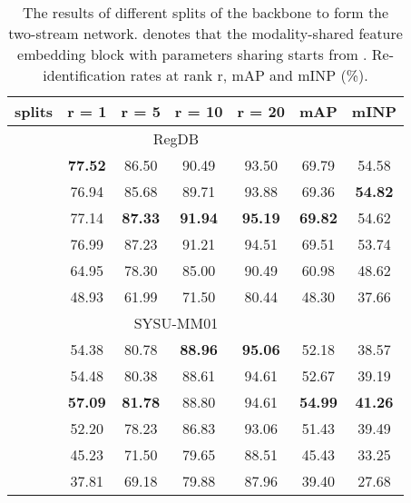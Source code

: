 \documentclass[journal]{IEEEtran}
\begin{document}
\begin{table}
\caption{The results of different splits of the backbone to form the two-stream network.  denotes that the modality-shared feature embedding block with parameters sharing starts from  . Re-identification rates at rank r, mAP and mINP (\%).}
\label{tab:net_share}
  \centering
\begin{tabular}{l|c|c|c|c|c|c}
    \toprule[2pt]
    splits  & r = 1 & r = 5 & r = 10 & r = 20 & mAP & mINP \\ \toprule[2pt]
    \multicolumn{6}{c}{RegDB} \\ \hline
     & \textbf{77.52} & 86.50 &  90.49 & 93.50 & 69.79 & 54.58 \\
     & 76.94 & 85.68 & 89.71  & 93.88 & 69.36 & \textbf{54.82} \\
     & 77.14 & \textbf{87.33} & \textbf{91.94}  & \textbf{95.19} & \textbf{69.82} & 54.62 \\
     & 76.99 & 87.23 & 91.21  & 94.51 & 69.51 & 53.74 \\
     & 64.95 & 78.30 & 85.00  & 90.49 & 60.98 & 48.62 \\
     & 48.93 & 61.99 & 71.50  & 80.44 & 48.30 & 37.66 \\  \toprule[2pt]
    \multicolumn{6}{c}{SYSU-MM01}\\ \hline
     & 54.38 & 80.78 & \textbf{88.96}  & \textbf{95.06} & 52.18 & 38.57 \\
     & 54.48 & 80.38 & 88.61  & 94.61 & 52.67 & 39.19 \\
     & \textbf{57.09} & \textbf{81.78} & 88.80  & 94.61 & \textbf{54.99} & \textbf{41.26} \\
     & 52.20 & 78.23 & 86.83  & 93.06 & 51.43 & 39.49 \\
     & 45.23 & 71.50 & 79.65  & 88.51 & 45.43 & 33.25 \\
     & 37.81 & 69.18 & 79.88  & 87.96 & 39.40 & 27.68 \\ \toprule[2pt]
  \end{tabular}
\end{table}
\end{document}
